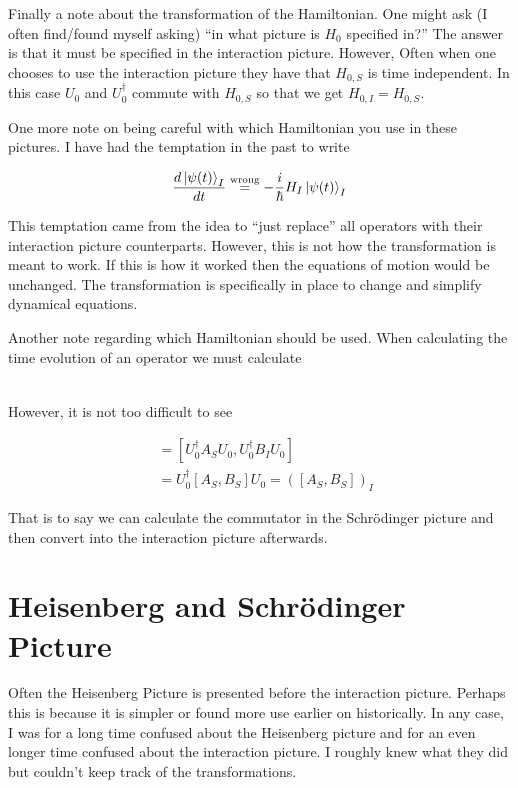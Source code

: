 \documentclass[12pt]{article}
\begin{document}
Finally a note about the transformation of the Hamiltonian. One might ask (I often find/found myself asking) ``in what picture is $H_0$ specified in?'' The answer is that it must be specified in the interaction picture. However, Often when one chooses to use the interaction picture they have that $H_{0,S}$ is time independent. In this case $U_0$ and $U_0^{\dag}$ commute with $H_{0,S}$ so that we get $H_{0,I} = H_{0,S}$.

One more note on being careful with which Hamiltonian you use in these pictures. I have had the temptation in the past to write

\begin{align}
\frac{d \ket{\psi(t)}_I}{d t} \overset{\text{wrong}}{=} -\frac{i}{\hbar} H_I \ket{\psi(t)}_I
\end{align}

This temptation came from the idea to ``just replace'' all operators with their interaction picture counterparts. However, this is not how the transformation is meant to work. If this is how it worked then the equations of motion would be unchanged. The transformation is specifically in place to change and simplify dynamical equations.

Another note regarding which Hamiltonian should be used. When calculating the time evolution of an operator we must calculate

\begin{align}
[A_I(t), H_{0,I}(t)]
\end{align}

However, it is not too difficult to see

\begin{align}
[A_I, B_I] &= [U_0^{\dag}A_SU_0, U_0^{\dag}B_IU_0]\\
&= U_0^{\dag}[A_S,B_S]U_0 = \left([A_S,B_S]\right)_I
\end{align}

That is to say we can calculate the commutator in the Schr{\"o}dinger picture and then convert into the interaction picture afterwards.


\section{Heisenberg and Schr{\"o}dinger Picture}

Often the Heisenberg Picture is presented before the interaction picture. Perhaps this is because it is simpler or found more use earlier on historically. In any case, I was for a long time confused about the Heisenberg picture and for an even longer time confused about the interaction picture. I roughly knew what they did but couldn't keep track of the transformations.
\end{document}
